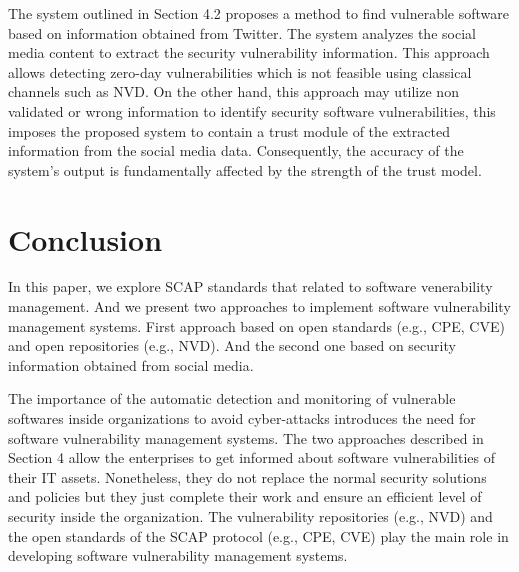 \documentclass{llncs}
\begin{document}
\par The system outlined in Section 4.2 proposes a method to find vulnerable software based on information obtained from Twitter. The system analyzes the social media content to extract the security vulnerability information. This approach allows detecting zero-day vulnerabilities which is not feasible using classical channels such as NVD. On the other hand, this approach may utilize non validated or wrong information to  identify security software vulnerabilities, this imposes the proposed system to contain a trust module of the extracted information from the social media data. Consequently, the accuracy of the system's output is  fundamentally affected by the strength of the trust model.
   
\section{Conclusion}
In this paper, we explore SCAP standards that related to software venerability management. And we present two approaches to implement software vulnerability management systems. First approach based on open standards (e.g., CPE, CVE) and open repositories (e.g., NVD). And the second one based on  security information obtained from social media.  
\par The importance of the automatic detection and monitoring of vulnerable softwares inside organizations to avoid cyber-attacks introduces the need for software vulnerability management systems. The two approaches described in Section 4 allow the enterprises to get informed about software vulnerabilities of their IT assets. Nonetheless, they do not replace the normal security solutions and policies but they just complete their work and ensure an efficient level of security inside the organization. The vulnerability repositories (e.g., NVD) and the open standards of the SCAP protocol (e.g., CPE, CVE) play the main role in developing software vulnerability management systems.   
\end{document}
